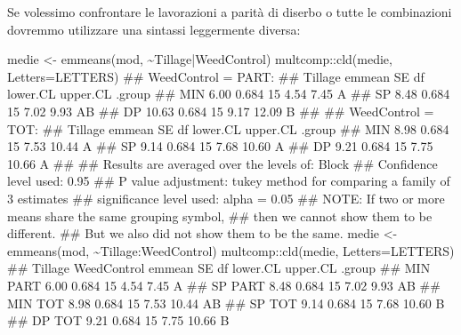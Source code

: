 \documentclass[a4paper,12pt,oneside]{book}
\newenvironment{Shaded}{\begin{snugshade}}{\end{snugshade}}
\newcommand{\SpecialCharTok}[1]{#1}
\newcommand{\DocumentationTok}[1]{#1}
\newcommand{\OtherTok}[1]{#1}
\newcommand{\FunctionTok}[1]{#1}
\newcommand{\AttributeTok}[1]{#1}
\newcommand{\AlertTok}[1]{#1}
\newcommand{\NormalTok}[1]{#1}
\begin{document}
Se volessimo confrontare le lavorazioni a parità di diserbo o tutte le combinazioni dovremmo utilizzare una sintassi leggermente diversa:

\begin{Shaded}
\begin{Highlighting}[]
\NormalTok{medie }\OtherTok{\textless{}{-}} \FunctionTok{emmeans}\NormalTok{(mod, }\SpecialCharTok{\textasciitilde{}}\NormalTok{Tillage}\SpecialCharTok{|}\NormalTok{WeedControl)}
\NormalTok{multcomp}\SpecialCharTok{::}\FunctionTok{cld}\NormalTok{(medie, }\AttributeTok{Letters=}\NormalTok{LETTERS)}
\DocumentationTok{\#\# WeedControl = PART:}
\DocumentationTok{\#\#  Tillage emmean    SE df lower.CL upper.CL .group}
\DocumentationTok{\#\#  MIN       6.00 0.684 15     4.54     7.45  A    }
\DocumentationTok{\#\#  SP        8.48 0.684 15     7.02     9.93  AB   }
\DocumentationTok{\#\#  DP       10.63 0.684 15     9.17    12.09   B   }
\DocumentationTok{\#\# }
\DocumentationTok{\#\# WeedControl = TOT:}
\DocumentationTok{\#\#  Tillage emmean    SE df lower.CL upper.CL .group}
\DocumentationTok{\#\#  MIN       8.98 0.684 15     7.53    10.44  A    }
\DocumentationTok{\#\#  SP        9.14 0.684 15     7.68    10.60  A    }
\DocumentationTok{\#\#  DP        9.21 0.684 15     7.75    10.66  A    }
\DocumentationTok{\#\# }
\DocumentationTok{\#\# Results are averaged over the levels of: Block }
\DocumentationTok{\#\# Confidence level used: 0.95 }
\DocumentationTok{\#\# P value adjustment: tukey method for comparing a family of 3 estimates }
\DocumentationTok{\#\# significance level used: alpha = 0.05 }
\DocumentationTok{\#\# }\AlertTok{NOTE}\DocumentationTok{: If two or more means share the same grouping symbol,}
\DocumentationTok{\#\#       then we cannot show them to be different.}
\DocumentationTok{\#\#       But we also did not show them to be the same.}
\NormalTok{medie }\OtherTok{\textless{}{-}} \FunctionTok{emmeans}\NormalTok{(mod, }\SpecialCharTok{\textasciitilde{}}\NormalTok{Tillage}\SpecialCharTok{:}\NormalTok{WeedControl)}
\NormalTok{multcomp}\SpecialCharTok{::}\FunctionTok{cld}\NormalTok{(medie, }\AttributeTok{Letters=}\NormalTok{LETTERS)}
\DocumentationTok{\#\#  Tillage WeedControl emmean    SE df lower.CL upper.CL .group}
\DocumentationTok{\#\#  MIN     PART          6.00 0.684 15     4.54     7.45  A    }
\DocumentationTok{\#\#  SP      PART          8.48 0.684 15     7.02     9.93  AB   }
\DocumentationTok{\#\#  MIN     TOT           8.98 0.684 15     7.53    10.44  AB   }
\DocumentationTok{\#\#  SP      TOT           9.14 0.684 15     7.68    10.60   B   }
\DocumentationTok{\#\#  DP      TOT           9.21 0.684 15     7.75    10.66   B   }

\end{Highlighting}
\end{Shaded}
\end{document}
